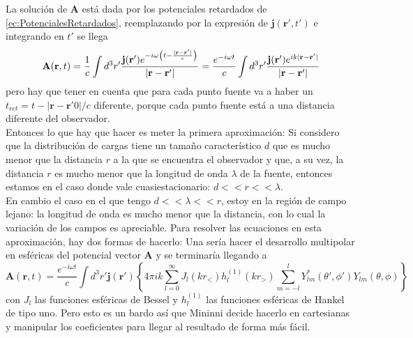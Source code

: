\indent La solución de $\textbf{A}$ está dada por los potenciales retardados de \eqref{ec:PotencialesRetardados}, reemplazando por la expresión de $\textbf{j}(\textbf{r}',t')$ e integrando en $t'$ se llega
\begin{equation*}
    \textbf{A}(\textbf{r},t) = \frac{1}{c}
    \int d^{3}r'
    \frac%
    {%
        \textbf{j}(\textbf{r}')
        e^%
        {%
            -i\omega
            \left(
                t - \frac{|\textbf{r}-\textbf{r}'|}{c}
            \right)
        }
    }%
    {%
        |\textbf{r}- \textbf{r}'|
    }
    = \frac{e^{-i\omega t}}{c}
    \int d^{3}r'
    \frac%
    {%
        \textbf{j}(\textbf{r}')e^{ik|\textbf{r}-\textbf{r}'|}
    }%
    {%
        |\textbf{r}-\textbf{r}'|
    }
\end{equation*}
pero hay que tener en cuenta que para cada punto fuente va a haber un $t_{ret} = t - |\textbf{r}-\textbf{r}'0|/c$ diferente, porque cada punto fuente está a una distancia diferente del observador.\\%
\indent Entonces lo que hay que hacer es meter la primera aproximación: Si considero que la distribución de cargas tiene un tamaño característico $d$ que es mucho menor que la distancia $r$ a la que se encuentra el observador y que, a su vez, la distancia $r$ es mucho menor que la longitud de onda $\lambda$ de la fuente, entonces estamos en el caso donde vale cuasiestacionario: $d << r << \lambda$.\\
\indent En cambio el caso en el que tengo $d << \lambda << r$, estoy en la región de campo lejano: la longitud de onda es mucho menor que la distancia, con lo cual la variación de los campos es apreciable. Para resolver las ecuaciones en esta aproximación, hay dos formas de hacerlo: Una sería hacer el desarrollo multipolar en esféricas del potencial vector $\textbf{A}$ y se terminaría llegando a
\begin{equation*}
    \textbf{A}(\textbf{r},t) = 
    \frac{e^{-i\omega t}}{c}
    \int d^{3}r'\textbf{j}(\textbf{r}')
    \left\{
        4\pi i k
        \sum\limits_{l = 0}^{\infty}
        J_{l}(kr_{<})h_{l}^{(1)}(kr_{>})
        \sum\limits_{m = -l}^{l}
        Y_{lm}^{*}(\theta', \phi')Y_{lm}(\theta, \phi)
    \right\}
\end{equation*}
con $J_{l}$ las funciones esféricas de Bessel y $h_{l}^{(1)}$ las funciones esféricas de Hankel de tipo uno. Pero esto es un bardo así que Mininni decide hacerlo en cartesianas y manipular los coeficientes para llegar al resultado de forma más fácil.\\
